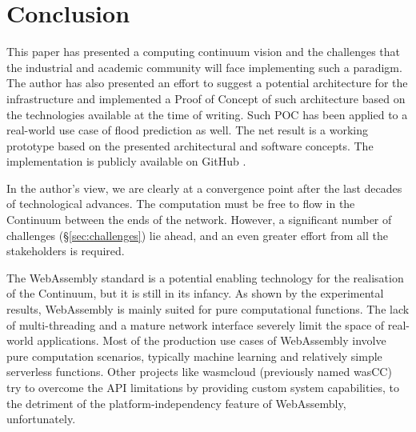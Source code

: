 \section{Conclusion}
\label{sec:conclusion}

This paper has presented a computing continuum vision and the challenges that the industrial and academic community will face implementing such a paradigm. The author has also presented an effort to suggest a potential architecture for the infrastructure and implemented a Proof of Concept of such architecture based on the technologies available at the time of writing. Such POC has been applied to a real-world use case of flood prediction as well. The net result is a working prototype based on the presented architectural and software concepts. The implementation is publicly available on GitHub \cite{fedra-thesis}. 

In the author's view, we are clearly at a convergence point after the last decades of technological advances. The computation must be free to flow in the Continuum between the ends of the network. However, a significant number of challenges (§\ref{sec:challenges}) lie ahead, and an even greater effort from all the stakeholders is required.

The WebAssembly standard is a potential enabling technology for the realisation of the Continuum, but it is still in its infancy. As shown by the experimental results, WebAssembly is mainly suited for pure computational functions. The lack of multi-threading and a mature network interface severely limit the space of real-world applications. Most of the production use cases of WebAssembly involve pure computation scenarios, typically machine learning and relatively simple serverless functions. Other projects like wasmcloud \cite{wasmcloud} (previously named wasCC) try to overcome the API limitations by providing custom system capabilities, to the detriment of the platform-independency feature of WebAssembly, unfortunately.


